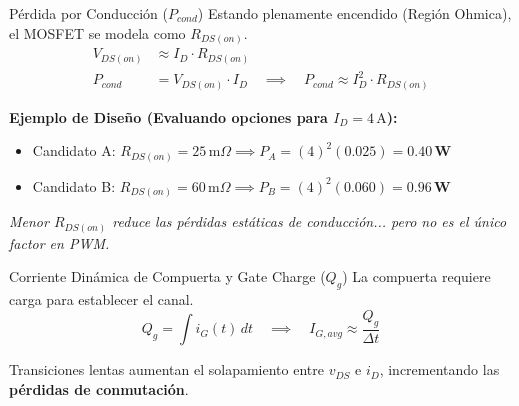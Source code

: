 \documentclass[aspectratio=169, table]{beamer}
\begin{document}
\begin{frame}{Pérdida por Conducción ($P_{cond}$)}
    Estando plenamente encendido (Región Ohmica), el MOSFET se modela como $R_{DS(on)}$.
    \begin{align*}
        V_{DS(on)} &\approx I_D \cdot R_{DS(on)} \\
        P_{cond} &= V_{DS(on)} \cdot I_D \quad \implies \quad \boxed{P_{cond} \approx I_D^2 \cdot R_{DS(on)}}
    \end{align*}
    
    \textbf{Ejemplo de Diseño (Evaluando opciones para $I_D = 4\,\text{A}$):}
    \begin{itemize}
        \item Candidato A: $R_{DS(on)} = 25\,\text{m}\Omega \implies P_A = (4)^2(0.025) = \mathbf{0.40\,\text{W}}$
        \item Candidato B: $R_{DS(on)} = 60\,\text{m}\Omega \implies P_B = (4)^2(0.060) = \mathbf{0.96\,\text{W}}$
    \end{itemize}
    \textit{Menor $R_{DS(on)}$ reduce las pérdidas estáticas de conducción... pero no es el único factor en PWM.}
\end{frame}

\begin{frame}{Corriente Dinámica de Compuerta y Gate Charge ($Q_g$)}
    La compuerta requiere carga para establecer el canal.
    \begin{equation*}
        Q_g = \int i_G(t) \,dt \quad \implies \quad I_{G,avg} \approx \frac{Q_g}{\Delta t}
    \end{equation*}
    
    \begin{center}
    \end{center}
    
    Transiciones lentas aumentan el solapamiento entre $v_{DS}$ e $i_D$, incrementando las \textbf{pérdidas de conmutación}.
\end{frame}
\end{document}
